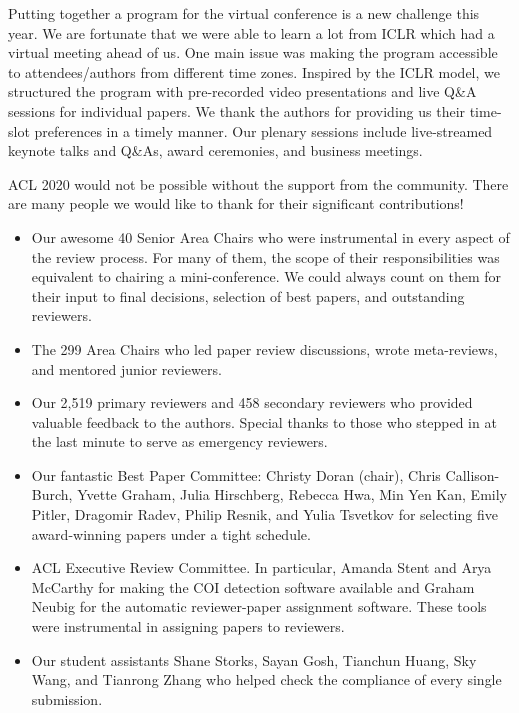 Putting together a program for the virtual conference is a new challenge this year. We are fortunate that we were able to learn a lot from ICLR which had a virtual meeting ahead of us. One main issue was making the program accessible to attendees/authors from different time zones.  Inspired by the ICLR model, we structured the program with pre-recorded video presentations and live Q\&A sessions for individual papers. We thank the authors for providing us their time-slot preferences in a timely manner.  Our plenary sessions include live-streamed keynote talks and Q\&As, award ceremonies, and business meetings.  

ACL 2020 would not be possible without the support from the community. There are many people we would like to thank for their significant contributions!

\begin{itemize}
\item Our awesome 40 Senior Area Chairs who were instrumental in every aspect of the review process. For many of them, the scope of their responsibilities was equivalent to chairing a mini-conference. We could always count on them for their input to final decisions, selection of best papers, and outstanding reviewers.

\item The 299 Area Chairs who led paper review discussions, wrote meta-reviews, and mentored junior reviewers. 
 
\item Our 2,519 primary reviewers and 458 secondary reviewers who provided valuable feedback to the authors. Special thanks to those who stepped in at the last minute to serve as emergency reviewers. 

\item Our fantastic Best Paper Committee: Christy Doran (chair), Chris Callison-Burch, Yvette Graham, Julia Hirschberg, Rebecca Hwa, Min Yen Kan, Emily Pitler, Dragomir Radev, Philip Resnik, and Yulia Tsvetkov for selecting five award-winning papers under a tight schedule. 

\item ACL Executive Review Committee.  In particular, Amanda Stent and Arya McCarthy for making the COI detection software available and Graham Neubig for the automatic reviewer-paper assignment software. These tools were instrumental in assigning papers to reviewers. 

\item Our student assistants Shane Storks, Sayan Gosh, Tianchun Huang, Sky Wang, and Tianrong Zhang who helped check the compliance of every single submission. 


\end{itemize}
